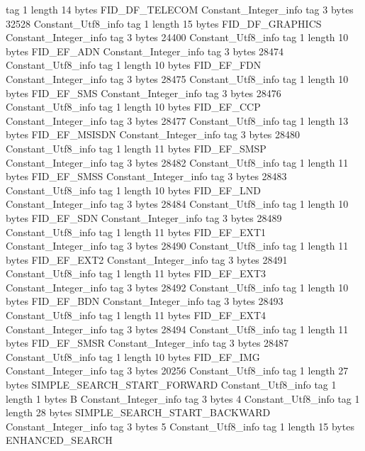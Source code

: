 {{{			tag	1
			length	14
			bytes	FID_DF_TELECOM
		}
		Constant_Integer_info {
			tag	3
			bytes	32528
		}
		Constant_Utf8_info {
			tag	1
			length	15
			bytes	FID_DF_GRAPHICS
		}
		Constant_Integer_info {
			tag	3
			bytes	24400
		}
		Constant_Utf8_info {
			tag	1
			length	10
			bytes	FID_EF_ADN
		}
		Constant_Integer_info {
			tag	3
			bytes	28474
		}
		Constant_Utf8_info {
			tag	1
			length	10
			bytes	FID_EF_FDN
		}
		Constant_Integer_info {
			tag	3
			bytes	28475
		}
		Constant_Utf8_info {
			tag	1
			length	10
			bytes	FID_EF_SMS
		}
		Constant_Integer_info {
			tag	3
			bytes	28476
		}
		Constant_Utf8_info {
			tag	1
			length	10
			bytes	FID_EF_CCP
		}
		Constant_Integer_info {
			tag	3
			bytes	28477
		}
		Constant_Utf8_info {
			tag	1
			length	13
			bytes	FID_EF_MSISDN
		}
		Constant_Integer_info {
			tag	3
			bytes	28480
		}
		Constant_Utf8_info {
			tag	1
			length	11
			bytes	FID_EF_SMSP
		}
		Constant_Integer_info {
			tag	3
			bytes	28482
		}
		Constant_Utf8_info {
			tag	1
			length	11
			bytes	FID_EF_SMSS
		}
		Constant_Integer_info {
			tag	3
			bytes	28483
		}
		Constant_Utf8_info {
			tag	1
			length	10
			bytes	FID_EF_LND
		}
		Constant_Integer_info {
			tag	3
			bytes	28484
		}
		Constant_Utf8_info {
			tag	1
			length	10
			bytes	FID_EF_SDN
		}
		Constant_Integer_info {
			tag	3
			bytes	28489
		}
		Constant_Utf8_info {
			tag	1
			length	11
			bytes	FID_EF_EXT1
		}
		Constant_Integer_info {
			tag	3
			bytes	28490
		}
		Constant_Utf8_info {
			tag	1
			length	11
			bytes	FID_EF_EXT2
		}
		Constant_Integer_info {
			tag	3
			bytes	28491
		}
		Constant_Utf8_info {
			tag	1
			length	11
			bytes	FID_EF_EXT3
		}
		Constant_Integer_info {
			tag	3
			bytes	28492
		}
		Constant_Utf8_info {
			tag	1
			length	10
			bytes	FID_EF_BDN
		}
		Constant_Integer_info {
			tag	3
			bytes	28493
		}
		Constant_Utf8_info {
			tag	1
			length	11
			bytes	FID_EF_EXT4
		}
		Constant_Integer_info {
			tag	3
			bytes	28494
		}
		Constant_Utf8_info {
			tag	1
			length	11
			bytes	FID_EF_SMSR
		}
		Constant_Integer_info {
			tag	3
			bytes	28487
		}
		Constant_Utf8_info {
			tag	1
			length	10
			bytes	FID_EF_IMG
		}
		Constant_Integer_info {
			tag	3
			bytes	20256
		}
		Constant_Utf8_info {
			tag	1
			length	27
			bytes	SIMPLE_SEARCH_START_FORWARD
		}
		Constant_Utf8_info {
			tag	1
			length	1
			bytes	B
		}
		Constant_Integer_info {
			tag	3
			bytes	4
		}
		Constant_Utf8_info {
			tag	1
			length	28
			bytes	SIMPLE_SEARCH_START_BACKWARD
		}
		Constant_Integer_info {
			tag	3
			bytes	5
		}
		Constant_Utf8_info {
			tag	1
			length	15
			bytes	ENHANCED_SEARCH
}}}
